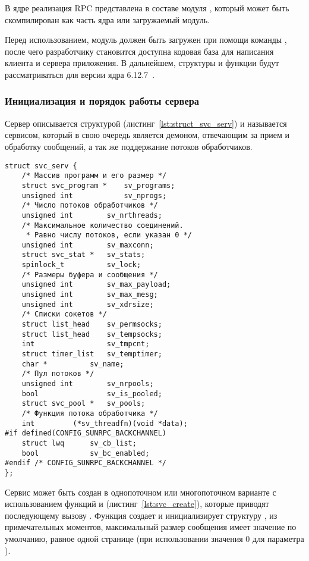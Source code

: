 В ядре реализация RPC представлена в составе модуля , который
может быть скомпилирован как часть ядра или загружаемый модуль.

Перед использованием, модуль должен быть загружен при помощи команды
, после чего разработчику становится доступна кодовая
база для написания клиента и сервера приложения. В дальнейшем, структуры и
функции будут рассматриваться для версии ядра 6.12.7~\cite{LinuxKernel6127}.

\subsubsection{Инициализация и порядок работы сервера}

Сервер описывается структурой  (листинг~\ref{lst:struct_svc_serv})
и называется сервисом, который в свою очередь является демоном, отвечающим за
прием и обработку сообщений, а так же поддержание потоков обработчиков.

\begin{lstlisting}[caption={Структура сервиса}, label={lst:struct_svc_serv}]
struct svc_serv {
    /* Массив программ и его размер */
    struct svc_program *    sv_programs;
    unsigned int            sv_nprogs;
    /* Число потоков обработчиков */
    unsigned int        sv_nrthreads;
    /* Максимальное количество соединений.
     * Равно числу потоков, если указан 0 */
    unsigned int        sv_maxconn;
    struct svc_stat *   sv_stats;
    spinlock_t          sv_lock;
    /* Размеры буфера и сообщения */
    unsigned int        sv_max_payload;
    unsigned int        sv_max_mesg;
    unsigned int        sv_xdrsize;
    /* Списки сокетов */
    struct list_head    sv_permsocks;
    struct list_head    sv_tempsocks;
    int                 sv_tmpcnt;
    struct timer_list   sv_temptimer;
    char *          sv_name;
    /* Пул потоков */
    unsigned int        sv_nrpools;
    bool                sv_is_pooled;
    struct svc_pool *   sv_pools;
    /* Функция потока обработчика */
    int         (*sv_threadfn)(void *data);
#if defined(CONFIG_SUNRPC_BACKCHANNEL)
    struct lwq      sv_cb_list;
    bool            sv_bc_enabled;
#endif /* CONFIG_SUNRPC_BACKCHANNEL */
};
\end{lstlisting}

Сервис может быть создан в однопоточном или многопоточном варианте с
использованием функций  и 
(листинг~\ref{lst:svc_create}), которые приводят последующему вызову
. Функция создает и инициализирует структуру
, из примечательных моментов, максимальный размер сообщения
 имеет значение по умолчанию, равное одной странице (при
использовании значения 0 для параметра ).


